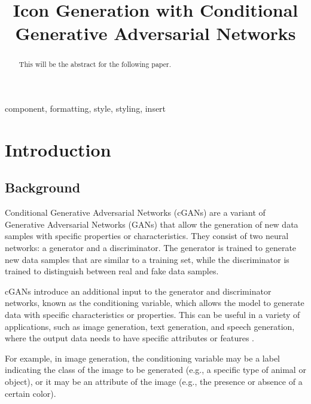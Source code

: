 \documentclass[conference]{IEEEtran}
\begin{document}
\title{Icon Generation with Conditional Generative Adversarial Networks}

\author{
}

\maketitle

\begin{abstract}
This will be the abstract for the following paper.
\end{abstract}

\begin{IEEEkeywords}
component, formatting, style, styling, insert
\end{IEEEkeywords}

\section{Introduction}

\subsection{Background}

Conditional Generative Adversarial Networks (cGANs) \cite{Mirza2014} are a variant of Generative Adversarial Networks (GANs) that allow the generation of new data samples with specific properties or characteristics. They consist of two neural networks: a generator and a discriminator. The generator is trained to generate new data samples that are similar to a training set, while the discriminator is trained to distinguish between real and fake data samples.

cGANs introduce an additional input to the generator and discriminator networks, known as the conditioning variable, which allows the model to generate data with specific characteristics or properties. This can be useful in a variety of applications, such as image generation, text generation, and speech generation, where the output data needs to have specific attributes or features \cite{Mirza2014}.

For example, in image generation, the conditioning variable may be a label indicating the class of the image to be generated (e.g., a specific type of animal or object), or it may be an attribute of the image (e.g., the presence or absence of a certain color).
\end{document}
